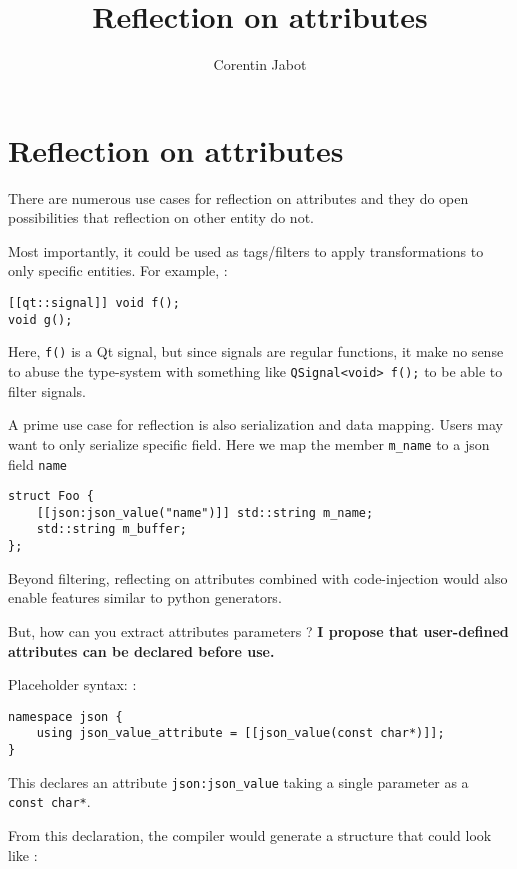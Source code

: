 \documentclass[a4paper,11pt]{article}
\title{\textbf{Reflection on attributes}}
\author{Corentin Jabot}
\date{}
\begin{document}
\maketitle

\section{Reflection on attributes}\label{reflection-on-attributes}

There are numerous use cases for reflection on attributes and they do
open possibilities that reflection on other entity do not.

Most importantly, it could be used as tags/filters to apply
transformations to only specific entities. For example, :

\begin{lstlisting}
[[qt::signal]] void f();
void g();
\end{lstlisting}

Here, \texttt{f()} is a Qt signal, but since signals are regular
functions, it make no sense to abuse the type-system with something like
\texttt{QSignal\textless{}void\textgreater{}\ f();} to be able to filter
signals.

A prime use case for reflection is also serialization and data mapping.
Users may want to only serialize specific field. Here we map the member
\texttt{m\_name} to a json field \texttt{name}

\begin{lstlisting}
struct Foo {
    [[json:json_value("name")]] std::string m_name;
    std::string m_buffer;
};
\end{lstlisting}

Beyond filtering, reflecting on attributes combined with code-injection
would also enable features similar to python generators.

But, how can you extract attributes parameters ? \textbf{I propose that
user-defined attributes can be declared before use.}

Placeholder syntax: :

\begin{lstlisting}
namespace json {
    using json_value_attribute = [[json_value(const char*)]];
}
\end{lstlisting}

This declares an attribute \texttt{json:json\_value} taking a single
parameter as a \texttt{const\ char*}.

From this declaration, the compiler would generate a structure that
could look like :
\end{document}
